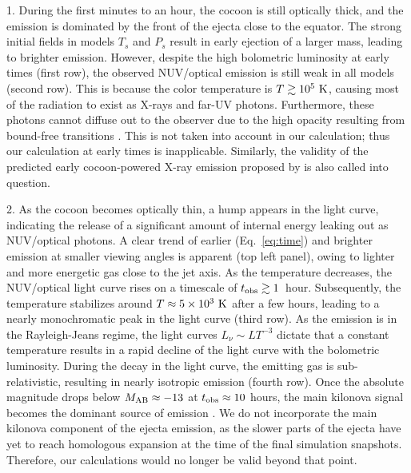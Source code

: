 \documentclass[twocolumn,dvipsnames]{aastex62}
\begin{document}
1. During the first minutes to an hour, the cocoon is still optically thick, and the emission is dominated by the front of the ejecta close to the equator. The strong initial fields in models $ T_s $ and $ P_s $ result in early ejection of a larger mass, leading to brighter emission. However, despite the high bolometric luminosity at early times (first row), the observed NUV/optical emission is still weak in all models (second row). This is because the color temperature is $ T \gtrsim 10^5~{\rm K} $, causing most of the radiation to exist as X-rays and far-UV photons. Furthermore, these photons cannot diffuse out to the observer due to the high opacity resulting from bound-free transitions \citep{Metzger2019}. This is not taken into account in our calculation; thus our calculation at early times is inapplicable. Similarly, the validity of the predicted early cocoon-powered X-ray emission proposed by \citet{Lazzati2017b,Lazzati2017a,Hamidani2022} is also called into question.

2. As the cocoon becomes optically thin, a hump appears in the light curve, indicating the release of a significant amount of internal energy leaking out as NUV/optical photons. A clear trend of earlier (Eq.~\eqref{eq:time}) and brighter emission at smaller viewing angles is apparent (top left panel), owing to lighter and more energetic gas close to the jet axis. As the temperature decreases, the NUV/optical light curve rises on a timescale of $ t_{\rm obs} \gtrsim 1 $~hour. Subsequently, the temperature stabilizes around $ T \approx 5\times 10^3~{\rm K} $ after a few hours, leading to a nearly monochromatic peak in the light curve (third row). As the emission is in the Rayleigh-Jeans regime, the light curves $ L_\nu \sim LT^{-3} $ dictate that a constant temperature results in a rapid decline of the light curve with the bolometric luminosity. During the decay in the light curve, the emitting gas is sub-relativistic, resulting in nearly isotropic emission (fourth row). Once the absolute magnitude drops below $ M_{\rm AB} \approx -13 $ at $ t_{\rm obs} \approx 10 $ hours, the main kilonova signal becomes the dominant source of emission \citep[see, e.g.,][]{Gompertz2023}. We do not incorporate the main kilonova component of the ejecta emission, as the slower parts of the ejecta have yet to reach homologous expansion at the time of the final simulation snapshots. Therefore, our calculations would no longer be valid beyond that point.
\end{document}
